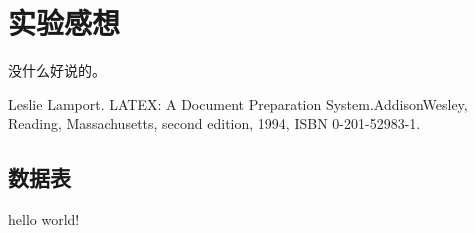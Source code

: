 \documentclass[a4paper,12pt]{report}
\begin{document}
\chapter{实验感想}
\begin{spacing}{1.5}
    没什么好说的。
\end{spacing}


\begin{thebibliography}{99}
\songti {}     
    Leslie Lamport. LATEX: A Document Preparation System.AddisonWesley, Reading, Massachusetts, second edition, 1994, ISBN 0-201-52983-1.
    
\end{thebibliography}


\lstset{breaklines}                %
\lstset{extendedchars=false}
\lstset{language=Matlab}
\renewcommand{\thechapter}{附录\Alph{chapter}.} 
\appendix
\begin{appendix}
    
    
\chapter{数据表}
\songti
\begin{spacing}{1.5}
    hello world!
\end{spacing}


\end{appendix}
        
\end{document}
